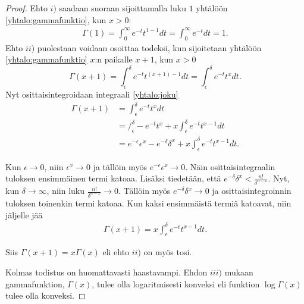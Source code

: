 \documentclass[12pt]{article}
\theoremstyle{definition}
\theoremstyle{plain}
\numberwithin{equation}{section}
\begin{document}
\begin{proof}
Ehto $i)$ saadaan suoraan sijoittamalla luku $1$ yhtälöön \eqref{yhtalo:gammafunktio}, kun $x>0$:
\begin{align*}
    \Gamma(1) = \int_0^\infty e^{-t}t^{1-1} dt = \int_0^\infty e^{-t}dt = 1.
\end{align*}
Ehto $ii)$ puolestaan voidaan osoittaa todeksi, kun sijoitetaan yhtälöön \eqref{yhtalo:gammafunktio} $x$:n paikalle $x+1$, kun $x>0$
\begin{equation}\label{yhtalo:joku}
    \Gamma(x+1)= \int_{\epsilon}^{\delta} e^{-t}t^{(x+1)-1} dt= \int_{\epsilon}^{\delta} e^{-t}t^{x} dt.
\end{equation}
Nyt osittaisintegroidaan integraali \eqref{yhtalo:joku}
\begin{align*}
    \Gamma(x+1) & = \int_{\epsilon}^{\delta} e^{-t} t^{x} dt \\
    & = \Big/_\epsilon^\delta -e^{-t}t^{x}+x\int_\epsilon^\delta e^{-t}t^{x-1}dt \\
    & = e^{-\epsilon}\epsilon^{x}-e^{-\delta}\delta^{x}+x\int_\epsilon^\delta e^{-t}t^{x-1}dt.
\end{align*}

Kun $\epsilon\rightarrow0$, niin $\epsilon^x\rightarrow0$ ja tällöin myös $e^{-\epsilon}\epsilon^x \rightarrow0$. Näin osittaisintegraalin tuloksen ensimmäinen termi katoaa. Lisäksi tiedetään, että $e^{-\delta}\delta^{x} < \frac{n!}{\delta^{n-x}}$. Nyt, kun $\delta\rightarrow\infty$, niin luku $\frac{n!}{\delta^{n-x}}\rightarrow0.$ Tällöin myös $e^{-\delta}\delta{^x}\rightarrow0$ ja osittaisintegroinnin tuloksen toinenkin termi katoaa. Kun kaksi ensimmäistä termiä katoavat, niin jäljelle jää 
\begin{align*}
   \Gamma(x+1)=x\int_\epsilon^\delta e^{-t}t^{x-1}dt.
\end{align*}

Siis $\Gamma(x+1) = x\Gamma(x)$ eli ehto $ii)$ on myös tosi.

Kolmas todistus on huomattavasti haastavampi. Ehdon $iii)$ mukaan gammafunktion, $\Gamma(x)$, tulee olla logaritmisesti konveksi eli funktion $\log\Gamma(x)$ tulee olla konveksi.


\end{proof}
\end{document}

